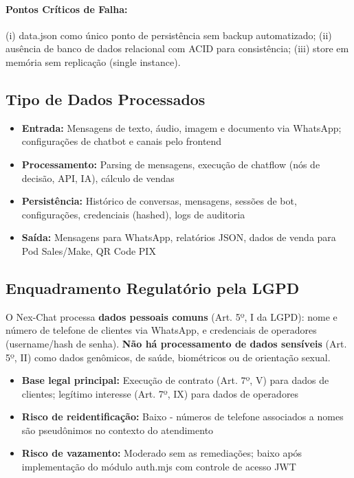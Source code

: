 \documentclass[11pt, a4paper]{article}
\begin{document}
\paragraph{Pontos Críticos de Falha:} (i) data.json como único ponto de persistência sem backup automatizado; (ii) ausência de banco de dados relacional com ACID para consistência; (iii) store em memória sem replicação (single instance).

\subsection{Tipo de Dados Processados}

\begin{itemize}
  \item \textbf{Entrada:} Mensagens de texto, áudio, imagem e documento via WhatsApp; configurações de chatbot e canais pelo frontend
  \item \textbf{Processamento:} Parsing de mensagens, execução de chatflow (nós de decisão, API, IA), cálculo de vendas
  \item \textbf{Persistência:} Histórico de conversas, mensagens, sessões de bot, configurações, credenciais (hashed), logs de auditoria
  \item \textbf{Saída:} Mensagens para WhatsApp, relatórios JSON, dados de venda para Pod Sales/Make, QR Code PIX
\end{itemize}

\subsection{Enquadramento Regulatório pela LGPD}

O Nex-Chat processa \textbf{dados pessoais comuns} (Art. 5º, I da LGPD): nome e número de telefone de clientes via WhatsApp, e credenciais de operadores (username/hash de senha). \textbf{Não há processamento de dados sensíveis} (Art. 5º, II) como dados genômicos, de saúde, biométricos ou de orientação sexual.

\begin{itemize}
  \item \textbf{Base legal principal:} Execução de contrato (Art. 7º, V) para dados de clientes; legítimo interesse (Art. 7º, IX) para dados de operadores
  \item \textbf{Risco de reidentificação:} Baixo - números de telefone associados a nomes são pseudônimos no contexto do atendimento
  \item \textbf{Risco de vazamento:} Moderado sem as remediações; baixo após implementação do módulo auth.mjs com controle de acesso JWT
\end{itemize}
\end{document}
